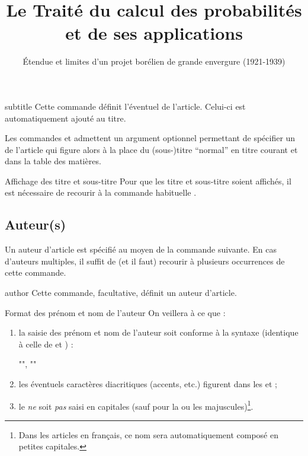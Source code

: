 \begin{docCommand}{subtitle}{}
  Cette commande définit l'éventuel  de l'article. Celui-ci
  est automatiquement ajouté au titre.
\end{docCommand}

Les commandes  et  admettent un argument
optionnel permettant de spécifier un  de l'article qui
figure alors à la place du (sous-)titre \enquote{normal} en titre courant et
dans la table des matières.

\begin{bodycode}[listing options={deletekeywords={title,subtitle}}]
\title[Le Traité du calcul des probabilités]{Le Traité du calcul des
  probabilités et de ses applications}
\subtitle[Étendue et limites d'un projet borélien]{Étendue et limites
  d'un projet borélien de grande envergure (1921-1939)}
\end{bodycode}

\begin{dbremark}{Affichage des titre et sous-titre}{}
  Pour que les titre et sous-titre soient affichés, il est nécessaire de
  recourir à la commande habituelle .
\end{dbremark}

\subsection{Auteur(s)}
\label{sec-auteurs}

Un auteur d'article est spécifié au moyen de la commande 
suivante. En cas d'auteurs multiples, il suffit de (et il faut) recourir
à plusieurs occurrences de cette commande.

\begin{docCommand}{author}{}
  Cette commande, facultative, définit un auteur d'article.
\end{docCommand}
%
\begin{dbwarning}{Format des prénom et nom de l'auteur}{}
  On veillera à ce que :
  \begin{enumerate}
  \item la saisie des prénom et nom de l'auteur soit conforme à la syntaxe
    (identique à celle de  et ) :
\begin{bodycode}[listing options={showspaces}]
"", ""
\end{bodycode}
  \item les éventuels caractères diacritiques (accents, etc.) figurent dans les
     et  ;
  \item le  \emph{ne} soit \emph{pas} saisi en capitales (sauf pour la
    ou les majuscules)\footnote{Dans les articles en français, ce nom sera
      automatiquement composé en petites capitales.}.
  \end{enumerate}
\end{dbwarning}

